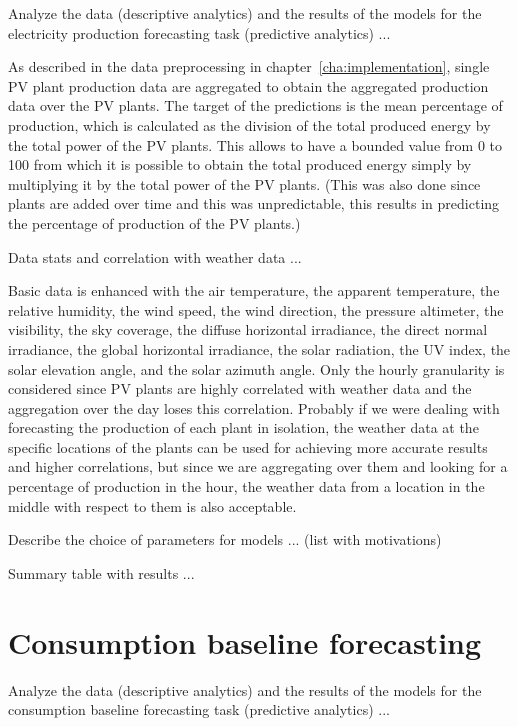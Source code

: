 Analyze the data (descriptive analytics) and the results of the models for the electricity production forecasting task (predictive analytics) ...

As described in the data preprocessing in chapter~\ref{cha:implementation}, single PV plant production data are aggregated to obtain the aggregated production data over the PV plants.
The target of the predictions is the mean percentage of production, which is calculated as the division of the total produced energy by the total power of the PV plants.
This allows to have a bounded value from 0 to 100 from which it is possible to obtain the total produced energy simply by multiplying it by the total power of the PV plants.
(This was also done since plants are added over time and this was unpredictable, this results in predicting the percentage of production of the PV plants.)

Data stats and correlation with weather data ...

Basic data is enhanced with the air temperature, the apparent temperature, the relative humidity, the wind speed, the wind direction, the pressure altimeter, the visibility, the sky coverage, the diffuse horizontal irradiance, the direct normal irradiance, the global horizontal irradiance, the solar radiation, the UV index, the solar elevation angle, and the solar azimuth angle.
Only the hourly granularity is considered since PV plants are highly correlated with weather data and the aggregation over the day loses this correlation.
Probably if we were dealing with forecasting the production of each plant in isolation, the weather data at the specific locations of the plants can be used for achieving more accurate results and higher correlations, but since we are aggregating over them and looking for a percentage of production in the hour, the weather data from a location in the middle with respect to them is also acceptable.

Describe the choice of parameters for models ... (list with motivations)

Summary table with results ...


\section{Consumption baseline forecasting} 
\label{sec:baselineval}
\vspace{0.2 cm}

Analyze the data (descriptive analytics) and the results of the models for the consumption baseline forecasting task (predictive analytics) ...

